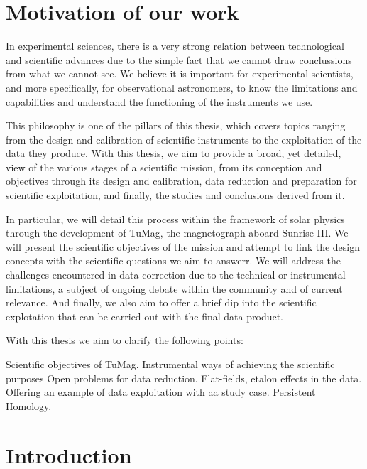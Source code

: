 \documentclass[12pt]{mythesis}
\begin{document}
\section{Motivation of our work}

In experimental sciences, there is a very strong relation between technological and scientific advances due to the simple fact that we cannot draw conclussions from what we cannot see. We believe it is important for experimental scientists, and more specifically, for observational astronomers, to know the limitations and capabilities and understand the functioning of the instruments we use. 

This philosophy is one of the pillars of this thesis, which covers topics ranging from the design and calibration of scientific instruments to the exploitation of the data they produce. With this thesis, we aim to provide a broad, yet detailed, view of the various stages of a scientific mission, from its conception and objectives through its design and calibration, data reduction and preparation for scientific exploitation, and finally, the studies and conclusions derived from it.

In particular, we will detail this process within the framework of solar physics through the development of TuMag, the magnetograph aboard Sunrise III. We will present the scientific objectives of the mission and attempt to link the design concepts with the scientific questions we aim to answerr. We will address the challenges encountered in data correction due to the technical or instrumental limitations, a subject of ongoing debate within the community and of current relevance. And finally, we also aim to offer a brief dip into the scientific explotation that can be carried out with the final data product. 

With this thesis we aim to clarify the following points:

\begin{itemize}
  \Myitem Scientific objectives of TuMag.
  \Myitem Instrumental ways of achieving the scientific purposes
  \Myitem Open problems for data reduction. Flat-fields, etalon effects in the data. 
  \Myitem Offering an example of data exploitation with aa study case. Persistent Homology.
\end{itemize}

\section{Introduction}
\end{document}

